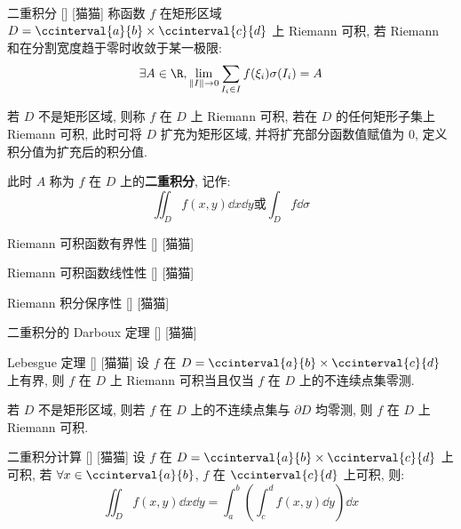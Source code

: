 \documentclass[UTF8]{ctexart}
\begin{document}
			\begin{dfn}
			    []
			    {二重积分}
			    []
			    [猫猫]
				称函数 \(f\) 在矩形区域 \(D=\ccinterval{a}{b}\times\ccinterval{c}{d}\) 上 Riemann 可积, 若 Riemann 和在分割宽度趋于零时收敛于某一极限:
				\[\exists A\in\R, \lim_{\|I\|\to 0}\sum_{I_i\in I}f(\xi_i)\sigma(I_i)=A\]

				若 \(D\) 不是矩形区域, 则称 \(f\) 在 \(D\) 上 Riemann 可积, 若在 \(D\) 的任何矩形子集上 Riemann 可积, 此时可将 \(D\) 扩充为矩形区域, 并将扩充部分函数值赋值为 \(0\), 定义积分值为扩充后的积分值. 

				此时 \(A\) 称为 \(f\) 在 \(D\) 上的\textbf{二重积分}, 记作: 
				\[\iint_{D}f(x,y)\dd x\dd y\text{或}\int_{D}f\dd\sigma\]
			\end{dfn}

			\begin{ppt}
			    []
			    {Riemann 可积函数有界性}
			    []
			    [猫猫]
			\end{ppt}
			
			\begin{ppt}
			    []
			    {Riemann 可积函数线性性}
			    []
			    [猫猫]
			\end{ppt}

			\begin{ppt}
			    []
			    {Riemann 积分保序性}
			    []
			    [猫猫]
			\end{ppt}

			\begin{thm}
			    []
			    {二重积分的 Darboux 定理}
			    []
			    [猫猫]
			\end{thm}

			\begin{thm}
			    []
			    {Lebesgue 定理}
			    []
			    [猫猫]
				设 \(f\) 在 \(D=\ccinterval{a}{b}\times\ccinterval{c}{d}\) 上有界, 则 \(f\) 在 \(D\) 上 Riemann 可积当且仅当 \(f\) 在 \(D\) 上的不连续点集零测. 

				若 \(D\) 不是矩形区域, 则若 \(f\) 在 \(D\) 上的不连续点集与 \(\partial D\) 均零测, 则 \(f\) 在 \(D\) 上 Riemann 可积. 
			\end{thm}

			\begin{thm}
			    []
			    {二重积分计算}
			    []
			    [猫猫]
				设 \(f\) 在 \(D=\ccinterval{a}{b}\times\ccinterval{c}{d}\) 上可积, 若 \(\forall x\in\ccinterval{a}{b}\), \(f\) 在 \(\ccinterval{c}{d}\) 上可积, 则: 
				\[\iint_{D}f(x,y)\dd x\dd y=\int_{a}^{b}\left(\int_{c}^{d}f(x,y)\dd y\right)\dd x\]
			\end{thm}
\end{document}
